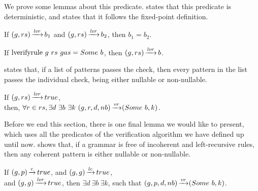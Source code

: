 We prove some lemmas about this predicate.
states that this predicate is deterministic,
and 
states that it follows the fixed-point definition.

\begin{lemma}
    If $(g,rs) \operatorname{\xrightarrow{\mathit{lvr}}} b_1$
    and $(g,rs) \operatorname{\xrightarrow{\mathit{lvr}}} b_2$,
    then $b_1 = b_2$.
    \label{lemma:lverifyrule-determinism}
\end{lemma}

\begin{lemma}
    If $\text{lverifyrule}{}\ g\ rs\ gas = Some\ b$,
    then $(g,rs) \operatorname{\xrightarrow{\mathit{lvr}}} b$.
    \label{lemma:lverifyrule-follows}
\end{lemma}

 states that,
if a list of patterns passes the check,
then every pattern in the list
passes the individual check,
being either nullable or non-nullable.

\begin{lemma}%
    If $(g,rs) \operatorname{\xrightarrow{\mathit{lvr}}} true$, \\
    then, $\forall r \in rs, \exists d\ \exists b\ \exists k\ \VerifyRule{g}{r}{d}{nb}{\Some b}{k}$.
    \label{lemma:lverifyrule-safety}
\end{lemma}

Before we end this section,
there is one final lemma we would like to present,
which uses all the predicates of the verification algorithm
we have defined up until now.
 shows that,
if a grammar is free of incoherent and left-recursive rules,
then any coherent pattern is either nullable or non-nullable.

\begin{lemma}%
    If $(g,p) \operatorname{\xrightarrow{\mathit{c}}} true$,
    and $(g,g) \operatorname{\xrightarrow{\mathit{lc}}} true$, \\
    and $(g,g) \operatorname{\xrightarrow{\mathit{lvr}}} true$,
    then $\exists d\ \exists b\ \exists k$,
    such that $(g,p,d,nb) \operatorname{\xrightarrow{\mathit{vr}}} (Some\ b,k)$.
    \label{lemma:no-lr-rule-in-grammar}
\end{lemma}
